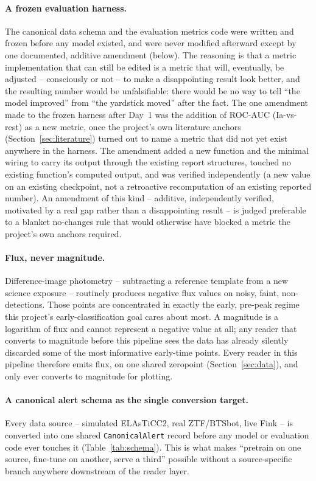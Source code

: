 \paragraph{A frozen evaluation harness.}
The canonical data schema and the evaluation metrics code were written and
frozen before any model existed, and were never modified afterward except
by one documented, additive amendment (below). The reasoning is that a
metric implementation that can still be edited is a metric that will,
eventually, be adjusted -- consciously or not -- to make a disappointing
result look better, and the resulting number would be unfalsifiable: there
would be no way to tell ``the model improved'' from ``the yardstick moved''
after the fact. The one amendment made to the frozen harness after Day~1
was the addition of ROC-AUC (Ia-vs-rest) as a new metric, once the project's
own literature anchors (Section~\ref{sec:literature}) turned out to name a
metric that did not yet exist anywhere in the harness. The amendment added a
new function and the minimal wiring to carry its output through the existing
report structures, touched no existing function's computed output, and was
verified independently (a new value on an existing checkpoint, not a
retroactive recomputation of an existing reported number). An amendment of
this kind -- additive, independently verified, motivated by a real gap
rather than a disappointing result -- is judged preferable to a blanket
no-changes rule that would otherwise have blocked a metric the project's
own anchors required.

\paragraph{Flux, never magnitude.}
Difference-image photometry -- subtracting a reference template from a new
science exposure -- routinely produces negative flux values on noisy,
faint, non-detections. Those points are concentrated in exactly the early,
pre-peak regime this project's early-classification goal cares about most.
A magnitude is a logarithm of flux and cannot represent a negative value at
all; any reader that converts to magnitude before this pipeline sees the
data has already silently discarded some of the most informative early-time
points. Every reader in this pipeline therefore emits flux, on one shared
zeropoint (Section~\ref{sec:data}), and only ever converts to magnitude for
plotting.

\paragraph{A canonical alert schema as the single conversion target.}
Every data source -- simulated ELAsTiCC2, real ZTF/BTSbot, live Fink -- is
converted into one shared \texttt{CanonicalAlert} record before any model
or evaluation code ever touches it (Table~\ref{tab:schema}). This is what
makes ``pretrain on one source, fine-tune on another, serve a third''
possible without a source-specific branch anywhere downstream of the reader
layer.

